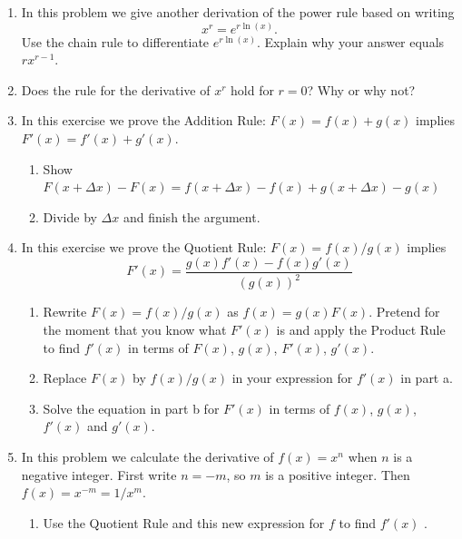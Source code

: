 \begin{enumerate}
\begin{enumerate}
\end{enumerate}
\item In this problem we give another derivation of the power rule
based on writing
\[
x^{\textstyle r} = e^{\textstyle r \ln(x)}.
\]
Use the chain rule to differentiate $e^{\textstyle r \ln(x)}$.  Explain why your answer equals $rx^{r-1}$. 


\item Does the rule for the derivative of $x^r$ hold for $r=0$?  Why or
why not?


\item In this exercise we prove the Addition Rule:  $F(x) = f(x) + g(x)$  implies  $F'(x) = f'(x) + g'(x)$.

  \begin{enumerate}
  \item Show  $F(x + \Delta x) - F(x) =  f(x + \Delta x) - f(x) + g(x + \Delta x) - g(x)$


  \item Divide by  $\Delta x$  and finish the argument.


\end{enumerate}
\item In this exercise we prove the Quotient Rule: $F(x) = f(x) / g(x)$
implies
	\[
F'(x) = \frac{g(x)f'(x) - f(x)g'(x)}{(g(x))^2}
\]


  \begin{enumerate}
  \item Rewrite $F(x) = f(x) / g(x)$ as $f(x) = g(x) F(x)$.  Pretend for
the moment that you know what $F'(x)$ is and apply the Product Rule to
find $f'(x)$ in terms of $F(x)$, $g(x)$, $F'(x)$, $g'(x)$.

  \item Replace $F(x)$ by $f(x) / g(x)$ in your expression for $f'(x)$ in
part a.

  \item Solve the equation in part b for $F'(x)$ in terms of $f(x)$,
$g(x)$, $f'(x)$ and $g'(x)$.


\end{enumerate}
\item In this problem we calculate the derivative of $f(x) = x^n$ when
$n$ is a negative integer.  First write $n = -m$, so $m$ is a positive
integer.  Then $f(x) = x^{-m} = 1 / {x^m}$.

  \begin{enumerate}
  \item Use the Quotient Rule and this new expression for $f$ to find
$f'(x)$ .


\end{enumerate}
\end{enumerate}
